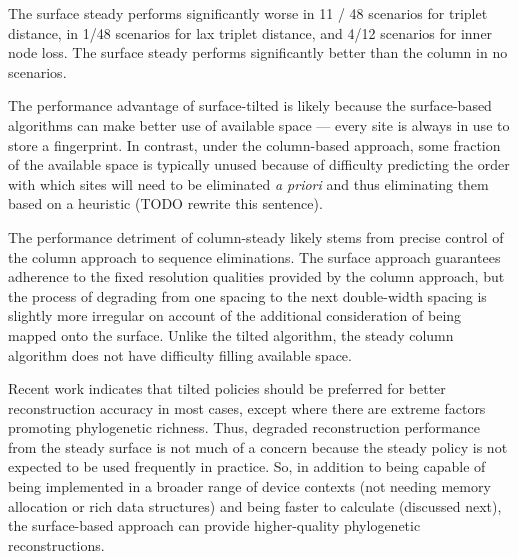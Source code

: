 The surface steady performs significantly worse in 11 / 48 scenarios for triplet distance, in 1/48 scenarios for lax triplet distance, and 4/12 scenarios for inner node loss.
The surface steady performs significantly better than the column in no scenarios.

The performance advantage of surface-tilted is likely because the surface-based algorithms can make better use of available space --- every site is always in use to store a fingerprint.
In contrast, under the column-based approach, some fraction of the available space is typically unused because of difficulty predicting the order with which sites will need to be eliminated \textit{a priori} and thus eliminating them based on a heuristic (TODO rewrite this sentence).

The performance detriment of column-steady likely stems from precise control of the column approach to sequence eliminations.
The surface approach guarantees adherence to the fixed resolution qualities provided by the column approach, but the process of degrading from one spacing to the next double-width spacing is slightly more irregular on account of the additional consideration of being mapped onto the surface.
Unlike the tilted algorithm, the steady column algorithm does not have difficulty filling available space.

Recent work indicates that tilted policies should be preferred for better reconstruction accuracy in most cases, except where there are extreme factors promoting phylogenetic richness.
Thus, degraded reconstruction performance from the steady surface is not much of a concern because the steady policy is not expected to be used frequently in practice.
So, in addition to being capable of being implemented in a broader range of device contexts (not needing memory allocation or rich data structures) and being faster to calculate (discussed next), the surface-based approach can provide higher-quality phylogenetic reconstructions.